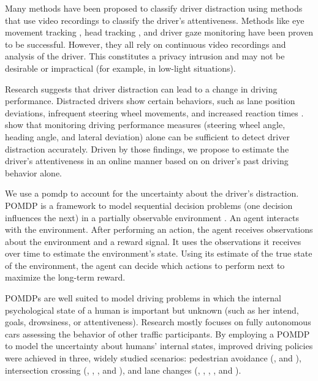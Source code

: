 Many methods have been proposed to classify driver distraction using methods that use video recordings to classify the driver's attentiveness. Methods like eye movement tracking \parencite{eye-movement}, head tracking \parencite{head-tracking}, and driver gaze monitoring \parencite{gaze-monitoring} have been proven to be successful. However, they all rely on continuous video recordings and analysis of the driver. This constitutes a privacy intrusion and may not be desirable or impractical (for example, in low-light situations). 

Research suggests that driver distraction can lead to a change in driving performance. Distracted drivers show certain behaviors, such as lane position deviations, infrequent steering wheel movements, and increased reaction times \parencite{driver-distraction-review}. \cite{dist-det-perf} show that monitoring driving performance measures (steering wheel angle, heading angle, and lateral deviation) alone can be sufficient to detect driver distraction accurately. Driven by those findings, we propose to estimate the driver's attentiveness in an online manner based on on driver's past driving behavior alone.

We use a \acrfull{pomdp} to account for the uncertainty about the driver's distraction. POMDP is a framework to model sequential decision problems (one decision influences the next) in a partially observable environment \parencite{pomdp-definition}. An agent interacts with the environment. After performing an action, the agent receives observations about the environment and a reward signal. It uses the observations it receives over time to estimate the environment's state. Using its estimate of the true state of the environment, the agent can decide which actions to perform next to maximize the long-term reward.

POMDPs are well suited to model driving problems in which the internal psychological state of a human is important but unknown (such as her intend, goals, drowsiness, or attentiveness). Research mostly focuses on fully autonomous cars assessing the behavior of other traffic participants. By employing a POMDP to model the uncertainty about humans' internal states, improved driving policies were achieved in three, widely studied scenarios: pedestrian avoidance (\cite{despot-crowd}, and \cite{pomdp-pedestrian-avoid-2}), intersection crossing (\cite{pomdp-intersection}, \cite{att_intersec}, \cite{pomdp-intersection-2}, and \cite{pomdp-intersection-3}), and lane changes (\cite{pomdp-lane-changes}, \cite{att_intersec}, \cite{pomdp-lane-changes-2}, \cite{tactical-decision}, and \cite{pomdp_towards_human}). 

